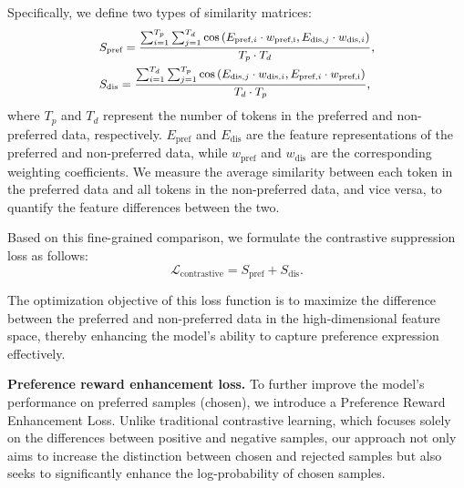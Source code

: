 Specifically, we define two types of similarity matrices:
\begin{equation}
\footnotesize
\begin{aligned}
&S_{\text{pref}} = \frac{\sum_{i=1}^{T_p} \sum_{j=1}^{T_d} \cos \left(E_{\text{pref}, i}\cdot w_{\text{pref,i}}, E_{\text{dis}, j}\cdot w_{\text{dis},i} \right)}{T_p \cdot T_d} ,\\
&S_{\text{dis}} = \frac{\sum_{i=1}^{T_d} \sum_{j=1}^{T_p} \cos \left(E_{\text{dis}, j}\cdot w_{\text{dis},i}, E_{\text{pref}, i}\cdot w_{\text{pref,i}} \right)}{T_d \cdot T_p} ,
\end{aligned}
\end{equation}
where $T_p$ and $T_d$ represent the number of tokens in the preferred and non-preferred data, respectively. $E_{\text{pref}}$ and $E_{\text{dis}}$ are the feature representations of the preferred and non-preferred data, while $w_{\text{pref}}$ and $w_{\text{dis}}$ are the corresponding weighting coefficients. We measure the average similarity between each token in the preferred data and all tokens in the non-preferred data, and vice versa, to quantify the feature differences between the two.

Based on this fine-grained comparison, we formulate the contrastive suppression loss as follows:
\begin{equation}
\mathcal{L}_{\text{contrastive}} = S_{\text{pref}} + S_{\text{dis}}.
\end{equation}


The optimization objective of this loss function is to maximize the difference between the preferred and non-preferred data in the high-dimensional feature space, thereby enhancing the model’s ability to capture preference expression effectively.

\textbf{Preference reward enhancement loss.}
To further improve the model’s performance on preferred samples (chosen), we introduce a Preference Reward Enhancement Loss. Unlike traditional contrastive learning, which focuses solely on the differences between positive and negative samples, our approach not only aims to increase the distinction between chosen and rejected samples but also seeks to significantly enhance the log-probability of chosen samples.

